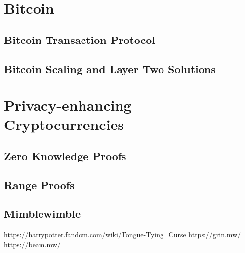 \section{Bitcoin}\label{secBitcoin}
\subsection{Bitcoin Transaction Protocol}\label{secBitcoinTx}
\subsection{Bitcoin Scaling and Layer Two Solutions}\label{secBitcoinScaling}
\section{Privacy-enhancing Cryptocurrencies}\label{secPrivacy}
\subsection{Zero Knowledge Proofs}\label{secZero}
\subsection{Range Proofs}\label{secRange}
\subsection{Mimblewimble}\label{secMimble}

\urldef\urlharrypotter\url{https://harrypotter.fandom.com/wiki/Tongue-Tying_Curse}
\urldef\urlgrin\url{https://grin.mw/}
\urldef\urlbeam\url{https://beam.mw/}

